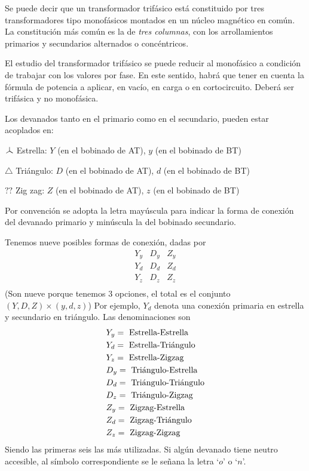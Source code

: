 \documentclass[11pt]{report}
\newcommand\wye{\scalerel*{\stackengine{-1pt}{
      \rotatebox[origin=c]{30}{\rule{10pt}{.9pt}}\kern-1pt
      \rotatebox[origin=c]{-30}{\rule{10pt}{1.3pt}}}{
      \rule{.9pt}{10pt}}{O}{c}{F}{F}{S}}{\Delta}}
\begin{document}
Se puede decir que un transformador trifásico está constituido por tres
transformadores tipo monofásicos montados
en un núcleo magnético en común. La constitución más común es la de
\textit{tres columnas}, con los arrollamientos
primarios y secundarios alternados o concéntricos.

El estudio del transformador trifásico se puede reducir al monofásico a
condición de trabajar con los valores por fase.
En este sentido, habrá que tener en cuenta la fórmula de potencia a aplicar, en
vacío, en carga o en cortocircuito. Deberá
ser trifásica y no monofásica.

Los devanados tanto en el primario como en el secundario, pueden estar
acoplados en:

$\wye$ Estrella: $Y$ (en el bobinado de AT), $y$ (en el bobinado de BT)

$\triangle$ Triángulo: $D$ (en el bobinado de AT), $d$ (en el bobinado de BT)

$??$ Zig zag: $Z$ (en el bobinado de AT), $z$ (en el bobinado de BT)

Por convención se adopta la letra mayúscula para indicar la forma de conexión
del devanado primario y minúscula la del bobinado
secundario.

Tenemos nueve posibles formas de conexión, dadas por
\begin{equation*}
  \begin{matrix}
    Y_y & D_y & Z_y \\
    Y_d & D_d & Z_d \\
    Y_z & D_z & Z_z \\
  \end{matrix}
\end{equation*}
(Son nueve porque tenemos 3 opciones, el total es el conjunto $(Y,D,Z)\times
  (y,d,z)$)
Por ejemplo, $Y_d$ denota una conexión primaria en estrella y secundario en
triángulo.
Las denominaciones son
\begin{equation*}
  \begin{aligned}
     & Y_y = \textnormal{ Estrella-Estrella}   \\
     & Y_d = \textnormal{ Estrella-Triángulo}  \\
     & Y_z = \textnormal{ Estrella-Zigzag}     \\
     & D_y = \textnormal{ Triángulo-Estrella}  \\
     & D_d = \textnormal{ Triángulo-Triángulo} \\
     & D_z = \textnormal{ Triángulo-Zigzag}    \\
     & Z_y = \textnormal{ Zigzag-Estrella}     \\
     & Z_d = \textnormal{ Zigzag-Triángulo}    \\
     & Z_z = \textnormal{ Zigzag-Zigzag}       \\
  \end{aligned}
\end{equation*}
Siendo las primeras seis las más utilizadas.
Si algún devanado tiene neutro accesible, al símbolo correspondiente se le
señana la letra
`$o$' o `$n$'.
\end{document}
